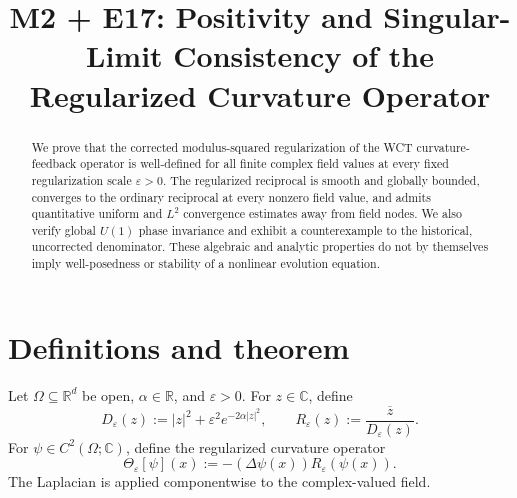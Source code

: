 \documentclass[11pt]{article}
\title{M2 + E17: Positivity and Singular-Limit Consistency of the
Regularized Curvature Operator}
\author{}
\date{}
\newcommand{\C}{\mathbb{C}}
\newcommand{\R}{\mathbb{R}}
\newcommand{\eps}{\varepsilon}
\newcommand{\Reps}{R_{\eps}}
\newcommand{\Deps}{D_{\eps}}
\newcommand{\Thetaeps}{\Theta_{\eps}}
\begin{document}
\maketitle

\begin{abstract}
We prove that the corrected modulus-squared regularization of the WCT
curvature-feedback operator is well-defined for all finite complex field
values at every fixed regularization scale $\eps>0$. The regularized
reciprocal is smooth and globally bounded, converges to the ordinary
reciprocal at every nonzero field value, and admits quantitative uniform
and $L^2$ convergence estimates away from field nodes. We also verify
global $U(1)$ phase invariance and exhibit a counterexample to the
historical, uncorrected denominator. These algebraic and analytic
properties do not by themselves imply well-posedness or stability of a
nonlinear evolution equation.
\end{abstract}

\section{Definitions and theorem}

Let $\Omega\subseteq\R^d$ be open, $\alpha\in\R$, and $\eps>0$. For
$z\in\C$, define
\begin{equation}\label{eq:definitions}
\Deps(z):=|z|^2+\eps^2e^{-2\alpha|z|^2},
\qquad
\Reps(z):=\frac{\overline z}{\Deps(z)}.
\end{equation}
For $\psi\in C^2(\Omega;\C)$, define the regularized curvature operator
\begin{equation}\label{eq:curvature}
\Thetaeps[\psi](x):=-(\Delta\psi(x))\Reps(\psi(x)).
\end{equation}
The Laplacian is applied componentwise to the complex-valued field.
\end{document}
